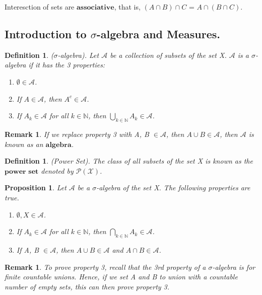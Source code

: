 \documentclass[twoside]{article}
\newtheorem{proposition}[theorem]{Proposition}
\newtheorem{remark}[theorem]{Remark}
\newtheorem{definition}[theorem]{Definition}
\begin{document}
Interesction of sets are $\textbf{associative}$, that is, $(A \cap B) \cap C$ = $A \cap (B \cap C)$.
\subsection{Introduction to $\sigma$-algebra and Measures.}

\begin{definition}
($\sigma$-algebra). Let $\mathcal{A}$ be a collection of subsets of the set X. $\mathcal{A}$ is a $\sigma$-algebra if it has the 3 properties:
\begin{enumerate}
  \item $\emptyset \in \mathcal{A}$.
  \item If $A \in \mathcal{A}$, then $A^c \in \mathcal{A}$.
  \item If $A_k \in \mathcal{A}$ for all $k \in \mathbb{N}$, then $\bigcup_{k \in \mathbb{N}}A_k \in \mathcal{A}$.
\end{enumerate}
\end{definition}

\begin{remark}
If we replace property 3 with A, B $\in \mathcal{A}$, then $A \cup B \in \mathcal{A}$, then $\mathcal{A}$ is known as an $\textbf{algebra}$.
\end{remark}

\begin{definition}
(Power Set). The class of all subsets of the set X is known as the $\textbf{power set}$ denoted by $\mathcal{P(X)}$.
\end{definition}

\begin{proposition}
Let $\mathcal{A}$ be a $\sigma$-algebra of the set X. The following properties are true.
\begin{enumerate}
  \item $\emptyset, X \in \mathcal{A}$.
  \item If $A_k \in \mathcal{A}$ for all $k \in \mathbb{N}$, then $\bigcap_{k \in \mathbb{N}}A_k \in \mathcal{A}$.
  \item If A, B $\in \mathcal{A}$, then $A \cup B \in \mathcal{A}$ and $A \cap B \in \mathcal{A}$.
\end{enumerate}
\end{proposition}

\begin{remark}
To prove property 3, recall that the 3rd property of a $\sigma$-algebra is for finite countable unions. Hence, if we set A and B to union with a countable number of empty sets, this can then prove property 3.
\end{remark}
\end{document}

